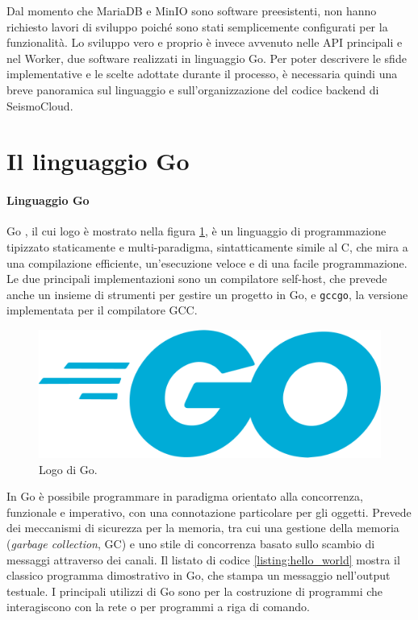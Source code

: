 Dal momento che MariaDB e MinIO sono software preesistenti, non hanno richiesto lavori di sviluppo poiché sono stati semplicemente configurati per la funzionalità. Lo sviluppo vero e proprio è invece avvenuto nelle API principali e nel Worker, due software realizzati in linguaggio Go. Per poter descrivere le sfide implementative e le scelte adottate durante il processo, è necessaria quindi una breve panoramica sul linguaggio e sull'organizzazione del codice backend di SeismoCloud.

\section{Il linguaggio Go}

\paragraph{Linguaggio Go} Go \cite{go}, il cui logo è mostrato nella figura \ref{fig:logo_go}, è un linguaggio di programmazione tipizzato staticamente e multi-paradigma, sintatticamente simile al C, che mira a una compilazione efficiente, un'esecuzione veloce e di una facile programmazione. Le due principali implementazioni sono un compilatore self-host, che prevede anche un insieme di strumenti per gestire un progetto in Go, e \texttt{gccgo}, la versione implementata per il compilatore GCC.

\begin{figure}
\centering
\includegraphics[scale=0.20]{assets/04/logogo.png}
\caption{Logo di Go.}
\label{fig:logo_go}
\end{figure}

In Go è possibile programmare in paradigma orientato alla concorrenza, funzionale e imperativo, con una connotazione particolare per gli oggetti. Prevede dei meccanismi di sicurezza per la memoria, tra cui una gestione della memoria (\textit{garbage collection}, GC) e uno stile di concorrenza basato sullo scambio di messaggi attraverso dei canali. Il listato di codice \ref{listing:hello_world} mostra il classico programma dimostrativo in Go, che stampa un messaggio nell'output testuale. I principali utilizzi di Go sono per la costruzione di programmi che interagiscono con la rete o per programmi a riga di comando.

